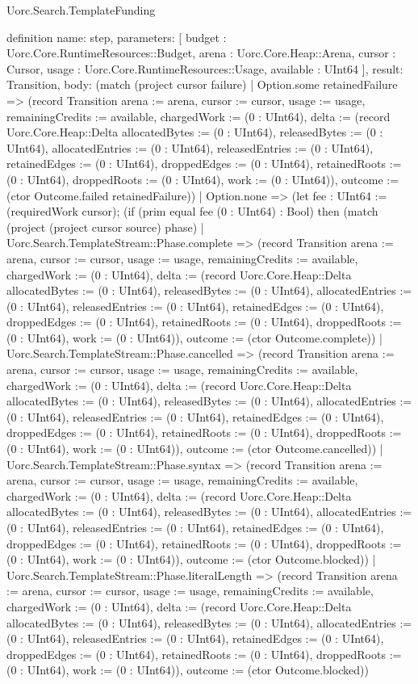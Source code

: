 \begin{lexlean}{Uorc.Search.TemplateFunding}
\begin{semanticmodule}
definition{
  name: step,
  parameters: [
    budget : Uorc.Core.RuntimeResources::Budget,
    arena : Uorc.Core.Heap::Arena,
    cursor : Cursor,
    usage : Uorc.Core.RuntimeResources::Usage,
    available : UInt64
  ],
  result: Transition,
  body: (match (project cursor failure)
    | Option.some retainedFailure => (record Transition {arena := arena, cursor := cursor, usage := usage, remainingCredits := available, chargedWork := (0 : UInt64), delta := (record Uorc.Core.Heap::Delta {allocatedBytes := (0 : UInt64), releasedBytes := (0 : UInt64), allocatedEntries := (0 : UInt64), releasedEntries := (0 : UInt64), retainedEdges := (0 : UInt64), droppedEdges := (0 : UInt64), retainedRoots := (0 : UInt64), droppedRoots := (0 : UInt64), work := (0 : UInt64)}), outcome := (ctor Outcome.failed retainedFailure)})
    | Option.none => (let fee : UInt64 := (requiredWork cursor); (if (prim equal fee (0 : UInt64) : Bool) then (match (project (project cursor source) phase)
      | Uorc.Search.TemplateStream::Phase.complete => (record Transition {arena := arena, cursor := cursor, usage := usage, remainingCredits := available, chargedWork := (0 : UInt64), delta := (record Uorc.Core.Heap::Delta {allocatedBytes := (0 : UInt64), releasedBytes := (0 : UInt64), allocatedEntries := (0 : UInt64), releasedEntries := (0 : UInt64), retainedEdges := (0 : UInt64), droppedEdges := (0 : UInt64), retainedRoots := (0 : UInt64), droppedRoots := (0 : UInt64), work := (0 : UInt64)}), outcome := (ctor Outcome.complete)})
      | Uorc.Search.TemplateStream::Phase.cancelled => (record Transition {arena := arena, cursor := cursor, usage := usage, remainingCredits := available, chargedWork := (0 : UInt64), delta := (record Uorc.Core.Heap::Delta {allocatedBytes := (0 : UInt64), releasedBytes := (0 : UInt64), allocatedEntries := (0 : UInt64), releasedEntries := (0 : UInt64), retainedEdges := (0 : UInt64), droppedEdges := (0 : UInt64), retainedRoots := (0 : UInt64), droppedRoots := (0 : UInt64), work := (0 : UInt64)}), outcome := (ctor Outcome.cancelled)})
      | Uorc.Search.TemplateStream::Phase.syntax => (record Transition {arena := arena, cursor := cursor, usage := usage, remainingCredits := available, chargedWork := (0 : UInt64), delta := (record Uorc.Core.Heap::Delta {allocatedBytes := (0 : UInt64), releasedBytes := (0 : UInt64), allocatedEntries := (0 : UInt64), releasedEntries := (0 : UInt64), retainedEdges := (0 : UInt64), droppedEdges := (0 : UInt64), retainedRoots := (0 : UInt64), droppedRoots := (0 : UInt64), work := (0 : UInt64)}), outcome := (ctor Outcome.blocked)})
      | Uorc.Search.TemplateStream::Phase.literalLength => (record Transition {arena := arena, cursor := cursor, usage := usage, remainingCredits := available, chargedWork := (0 : UInt64), delta := (record Uorc.Core.Heap::Delta {allocatedBytes := (0 : UInt64), releasedBytes := (0 : UInt64), allocatedEntries := (0 : UInt64), releasedEntries := (0 : UInt64), retainedEdges := (0 : UInt64), droppedEdges := (0 : UInt64), retainedRoots := (0 : UInt64), droppedRoots := (0 : UInt64), work := (0 : UInt64)}), outcome := (ctor Outcome.blocked)})
}
\end{semanticmodule}
\end{lexlean}
